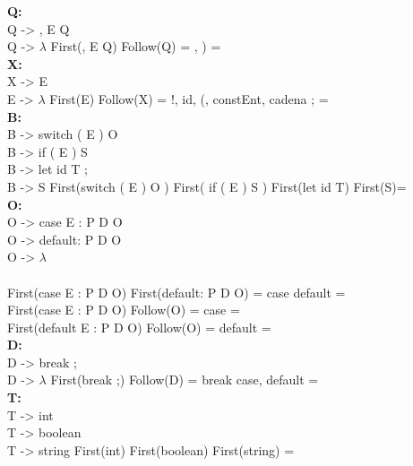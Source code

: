 \documentclass{article}[a4paper]
\newcommand\tab[1][1cm]{\hspace*{#1}}
\begin{document}
\textbf{Q:}\\
\tab Q -> , E Q \\ \tab Q -> $\lambda$
\tab \tab First(, E Q) \cap  Follow(Q) = \lbrace , \rbrace \cap \lbrace ) \rbrace = \emptyset \\

\textbf{X:}\\
\tab X -> E \\ \tab E -> $\lambda$
\tab \tab First(E) \cap  Follow(X) = \lbrace !, id, (, constEnt, cadena \rbrace \cap \lbrace ; \rbrace = \emptyset \\

\textbf{B:}\\
\tab B -> switch ( E ) \lbrace O \rbrace \\ \tab B -> if ( E ) S \\ \tab B -> let id T ; \\ \tab B -> S
\tab \tab First(switch ( E ) \lbrace O \rbrace ) \cap  First( if ( E ) S ) \cap First(let id T) \cap First(S)= \emptyset \\

\textbf{O:}\\
\tab O -> case E : P D O \\ \tab O -> default: P D O \\ \tab O -> $\lambda$ \\ \\
\tab \tab First(case E : P D O) \cap First(default: P D O) = \lbrace case \rbrace \cap \lbrace default \rbrace  = \emptyset \\
\tab \tab First(case E : P D O) \cap Follow(O) = \lbrace case \rbrace \cap \lbrace \rbrace \rbrace = \emptyset \\
\tab \tab First(default E : P D O) \cap Follow(O) = \lbrace default \rbrace \cap \lbrace \rbrace \rbrace = \emptyset \\

\textbf{D:}\\
\tab D -> break ; \\ \tab D -> $\lambda$
\tab \tab First(break ;) \cap  Follow(D) = \lbrace break \rbrace \cap \lbrace case, default \rbrace = \emptyset \\

\textbf{T:}\\
\tab T -> int\\ \tab T -> boolean\\ \tab T -> string
\tab \tab First(int) \cap  First(boolean) \cap First(string) = \emptyset \\
\end{document}
